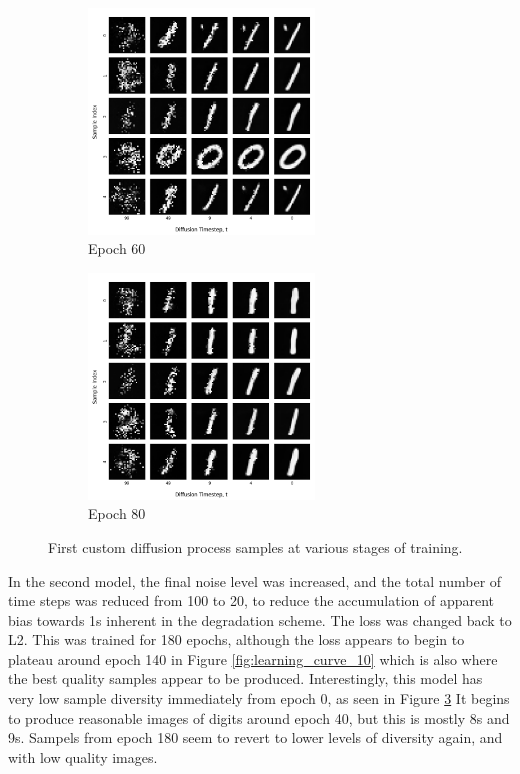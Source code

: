 \documentclass[12pt]{article}
\begin{document}
\begin{figure}[hp]
    \begin{subfigure}{0.49\textwidth}
    \includegraphics[width=0.9\linewidth, height=6cm, center]{figures/diffusion_plot_9_0060.png}
    \caption{Epoch 60}
    \label{fig:9_60}
    \end{subfigure}
    \begin{subfigure}{0.49\textwidth}
    \includegraphics[width=0.9\linewidth, height=6cm, center]{figures/diffusion_plot_9_0080.png}
    \caption{Epoch 80}
    \label{fig:9_80}
    \end{subfigure}

    \caption{First custom diffusion process samples at various stages of training.}
    \label{fig:diffusion_9}
\end{figure}

In the second model, the final noise level was increased, and the total number of time steps was reduced from 100 to 20,
to reduce the accumulation of apparent bias towards 1s inherent in the degradation scheme.
The loss was changed back to L2.
This was trained for 180 epochs, although the loss appears to begin to plateau around epoch 140 in Figure \ref{fig:learning_curve_10} which is also where the best quality samples appear to be produced.
Interestingly, this model has very low sample diversity immediately from epoch 0, as seen in Figure \ref{fig:diffusion_9}
It begins to produce reasonable images of digits around epoch 40, but this is mostly 8s and 9s.
Sampels from epoch 180 seem to revert to lower levels of diversity again, and with low quality images.
\end{document}
